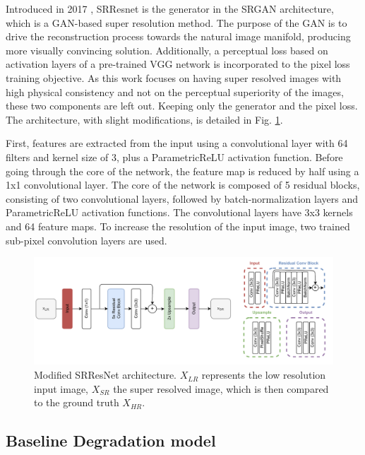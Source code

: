    Introduced in 2017 \cite{ledig2017photorealistic}, SRResnet is the generator in the SRGAN architecture, which is a GAN-based super resolution method. The purpose of the GAN is to drive the reconstruction process towards the natural image manifold, producing more visually convincing solution. Additionally, a perceptual loss based on activation layers of a pre-trained VGG network \cite{simonyan2015deep} is incorporated to the pixel loss training objective. As this work focuses on having super resolved images with high physical consistency and not on the perceptual superiority of the images, these two components are left out.  Keeping only the generator and the pixel loss. The architecture, with slight modifications, is detailed in Fig. \ref{fig:3-resnet-architecture}.

    First, features are extracted from the input using a convolutional layer with 64 filters and kernel size of 3, plus a ParametricReLU activation function.
    Before going through the core of the network, the feature map is reduced by half using a 1x1 convolutional layer.
    The core of the network is composed of 5 residual blocks, consisting of two convolutional layers, followed by batch-normalization layers and ParametricReLU activation functions. 
    The convolutional layers have 3x3 kernels and 64 feature maps. 
    To increase the resolution of the input image, two trained sub-pixel convolution layers are used.

    \begin{figure}[H]
        \centering
        \includegraphics[width=1\textwidth]{Includes/3-srresnet-architecture.pdf}
        \caption{ Modified SRResNet architecture. $X_{LR}$ represents the low resolution input image, $X_{SR}$ the super resolved image, which is then compared to the ground truth $X_{HR}$.}
        \label{fig:3-resnet-architecture}
     \end{figure}
    
    \subsection{Baseline Degradation model} \label{subsec:baseline_degradation_model}

